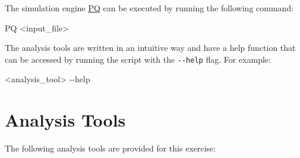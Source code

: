 \documentclass[
  letterpaper,
  DIV=11,
  numbers=noendperiod]{scrreprt}
\newenvironment{Shaded}{\begin{snugshade}}{\end{snugshade}}
\newcommand{\ExtensionTok}[1]{\textcolor[rgb]{0.00,0.23,0.31}{#1}}
\newcommand{\NormalTok}[1]{\textcolor[rgb]{0.00,0.23,0.31}{#1}}
\newcommand{\OperatorTok}[1]{\textcolor[rgb]{0.37,0.37,0.37}{#1}}
\begin{document}
The simulation engine \href{https://github.com/MolarVerse/PQ}{PQ} can be
executed by running the following command:

\begin{Shaded}
\begin{Highlighting}[]
\ExtensionTok{PQ} \OperatorTok{\textless{}}\NormalTok{input\_file}\OperatorTok{\textgreater{}}
\end{Highlighting}
\end{Shaded}

The analysis tools are written in an intuitive way and have a help
function that can be accessed by running the script with the
\texttt{-\/-help} flag. For example:

\begin{Shaded}
\begin{Highlighting}[]
\OperatorTok{\textless{}}\NormalTok{analysis\_tool}\OperatorTok{\textgreater{}}\NormalTok{ {-}{-}help}
\end{Highlighting}
\end{Shaded}

\hypertarget{analysis-tools}{%
\section*{Analysis Tools}\label{analysis-tools}}


The following analysis tools are provided for this exercise:
\end{document}
